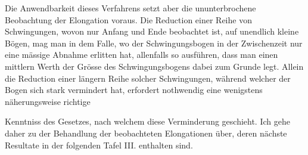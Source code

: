Die Anwendbarkeit dieses Verfahrens setzt aber die ununterbrochene Beobachtung der Elongation voraus. Die Reduction einer Reihe von Schwingungen, wovon nur Anfang und Ende beobachtet ist, auf unendlich kleine Bögen, mag man in dem Falle, wo der Schwingungsbogen in der Zwischenzeit nur eine mässige Abnahme erlitten hat, allenfalls so ausführen, dass man einen mittlern Werth der Grösse des Schwingungsbogens dabei zum Grunde legt. Allein die Reduction einer längern Reihe solcher Schwingungen, während welcher der Bogen sich stark vermindert hat, erfordert nothwendig eine wenigstens näherungsweise richtige
\par\clearpage
{}
\noindent Kenntniss des Gesetzes, nach welchem diese Verminderung geschieht. Ich gehe daher zu der Behandlung der beobachteten Elongationen über, deren nächste Resultate in der folgenden Tafel III. enthalten sind.
